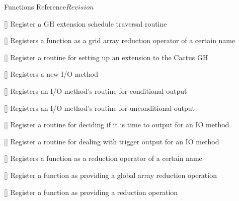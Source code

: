 \begin{cactuspart}{ Functions Reference}{}{$Revision$}
\begin{Lentry}
\item[\code{CCTK\_RegisterGHExtensionScheduleTraverseGH}]
  [\pageref{CCTK-RegisterGHExtensionScheduleTraverseGH}]
  Register a GH extension schedule traversal routine

\item[\code{CCTK\_RegisterGridArrayReductionOperator}] [\pageref{CCTK-RegisterGridArrayReductionOperator}]
  Registers a function as a grid array reduction operator of a certain name

\item[\code{CCTK\_RegisterGHExtensionSetupGH}]
  [\pageref{CCTK-RegisterGHExtensionSetupGH}]
  Register a routine for setting up an extension to the Cactus GH

\item[\code{CCTK\_RegisterIOMethod}]
  [\pageref{CCTK-RegisterIOMethod}]
  Registers a new I/O method

\item[\code{CCTK\_RegisterIOMethodOutputGH}]
  [\pageref{CCTK-RegisterIOMethodOutputGH}]
  Registers an I/O method's routine for conditional output

\item[\code{CCTK\_RegisterIOMethodOutputVarAs}]
  [\pageref{CCTK-RegisterIOMethodOutputVarAs}]
  Registers an I/O method's routine for unconditional output

\item[\code{CCTK\_RegisterIOMethodTimeToOutput}]
  [\pageref{CCTK-RegisterIOMethodTimeToOutput}]
  Register a routine for deciding if it is time to output for an IO method

\item[\code{CCTK\_RegisterIOMethodTriggerOutput}]
  [\pageref{CCTK-RegisterIOMethodTriggerOutput}]
  Register a routine for dealing with trigger output for an IO method

\item[\code{CCTK\_RegisterLocalArrayReductionOperator}] [\pageref{CCTK-RegisterLocalArrayReductionOperator}]
  Registers a function as a reduction operator of a certain name

\item[\code{CCTK\_RegisterReduceArraysGloballyOperator}]
  [\pageref{CCTK-RegisterReduceArraysGloballyOperator}]
  Register a function as providing a global array reduction operation

\item[\code{CCTK\_RegisterReductionOperator}]
  [\pageref{CCTK-RegisterReductionOperator}]
  Register a function as providing a reduction operation


\end{Lentry}
\end{cactuspart}
